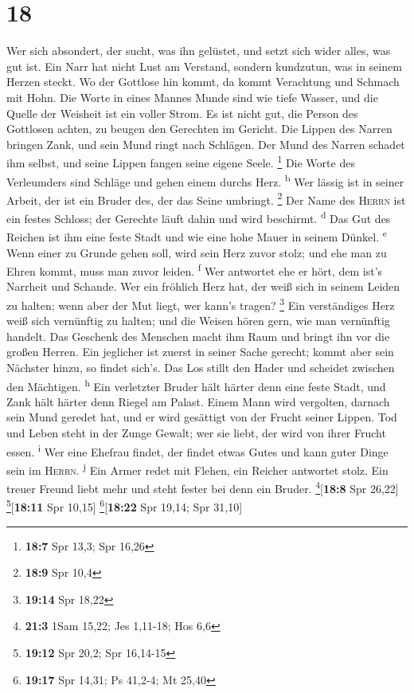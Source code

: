 \hypertarget{section-17}{%
\section{18}\label{section-17}}

 Wer sich absondert, der sucht, was ihn gelüstet, und
setzt sich wider alles, was gut ist.  Ein Narr hat nicht
Lust am Verstand, sondern kundzutun, was in seinem Herzen steckt.
 Wo der Gottlose hin kommt, da kommt Verachtung und
Schmach mit Hohn.  Die Worte in eines Mannes Munde sind
wie tiefe Wasser, und die Quelle der Weisheit ist ein voller Strom.
 Es ist nicht gut, die Person des Gottlosen achten, zu
beugen den Gerechten im Gericht.  Die Lippen des Narren
bringen Zank, und sein Mund ringt nach Schlägen.  Der Mund
des Narren schadet ihm selbst, und seine Lippen fangen seine eigene
Seele. \footnote{\textbf{18:7} Spr 13,3; Spr 16,26}  Die
Worte des Verleumders sind Schläge und gehen einem durchs Herz.
\textsuperscript{b}  Wer lässig ist in seiner Arbeit, der
ist ein Bruder des, der das Seine umbringt. \footnote{\textbf{18:9} Spr
  10,4}  Der Name des \textsc{Herrn} ist ein festes
Schloss; der Gerechte läuft dahin und wird beschirmt.
\textsuperscript{d}  Das Gut des Reichen ist ihm eine
feste Stadt und wie eine hohe Mauer in seinem Dünkel.
\textsuperscript{e}  Wenn einer zu Grunde gehen soll,
wird sein Herz zuvor stolz; und ehe man zu Ehren kommt, muss man zuvor
leiden. \textsuperscript{f}  Wer antwortet ehe er hört,
dem ist's Narrheit und Schande.  Wer ein fröhlich Herz
hat, der weiß sich in seinem Leiden zu halten; wenn aber der Mut liegt,
wer kann's tragen? \footnote{\textbf{19:14} Spr 18,22} 
Ein verständiges Herz weiß sich vernünftig zu halten; und die Weisen
hören gern, wie man vernünftig handelt.  Das Geschenk des
Menschen macht ihm Raum und bringt ihn vor die großen Herren.
 Ein jeglicher ist zuerst in seiner Sache gerecht; kommt
aber sein Nächster hinzu, so findet sich's.  Das Los
stillt den Hader und scheidet zwischen den Mächtigen.
\textsuperscript{h}  Ein verletzter Bruder hält härter
denn eine feste Stadt, und Zank hält härter denn Riegel am Palast.
 Einem Mann wird vergolten, darnach sein Mund geredet
hat, und er wird gesättigt von der Frucht seiner Lippen. 
Tod und Leben steht in der Zunge Gewalt; wer sie liebt, der wird von
ihrer Frucht essen. \textsuperscript{i}  Wer eine Ehefrau
findet, der findet etwas Gutes und kann guter Dinge sein im
\textsc{Herrn}. \textsuperscript{j}  Ein Armer redet mit
Flehen, ein Reicher antwortet stolz.  Ein treuer Freund
liebt mehr und steht fester bei denn ein Bruder.
\footnote{\textbf{21:3} 1Sam 15,22; Jes 1,11-18; Hos 6,6}{[}\textbf{18:8}
Spr 26,22{]} \footnote{\textbf{19:12} Spr 20,2; Spr 16,14-15}{[}\textbf{18:11}
Spr 10,15{]} \footnote{\textbf{19:17} Spr 14,31; Ps 41,2-4; Mt 25,40}{[}\textbf{18:22}
Spr 19,14; Spr 31,10{]}

